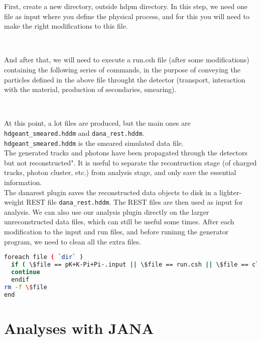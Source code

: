 \documentclass{article}
\begin{document}
First, create a new directory, outside hdpm directory.
\newline In this step, we need one file as input where you define the physical process, and for this you will need to make the right modifications to this file.



~\par And after that, we will need to execute a run.csh file (after some modifications) containing the following series of commands, in the purpose of conveying the particles defined in the above file throught the detector (transport, interaction with the material, production of secondaries, smearing).



~\par At this point, a lot files are produced, but the main ones are \texttt{hdgeant\_smeared.hddm} and \texttt{dana\_rest.hddm}.\\
\texttt{hdgeant\_smeared.hddm} is the smeared simulated data file.\\
The generated tracks and photons have been propagated through the detectors but not reconstructed". It is useful to separate the recontruction stage (of charged tracks, photon cluster, etc.) from analysis stage, and only save the essential information.\\
The danarest plugin saves the reconstructed data objects to disk in a lighter-weight REST file \texttt{dana\_rest.hddm}.
The REST files are then used as input for analysis. We can also use our analysis plugin directly on the larger unreconstructed data files, which can still be useful some times.
\newline After each modification to the input and run files, and before runinng the generator program, we need to clean all the extra files.

\begin{lstlisting}[language=bash]
foreach file ( `dir` )
  if ( \$file == pK+K-Pi+Pi-.input || \$file == run.csh || \$file == clean.csh ) then
  continue
  endif
rm -f \$file                                                                                                                                              
end
\end{lstlisting} 
 
\section{Analyses with JANA}
\end{document}
